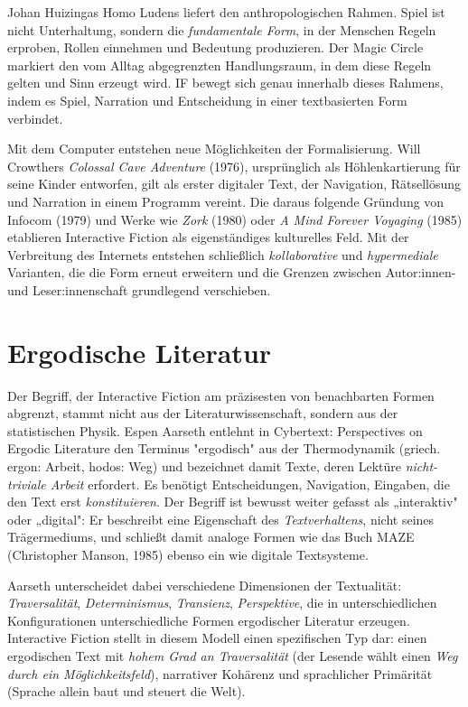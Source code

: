 \documentclass[parskip=half,a4paper,11pt]{scrreprt}
\begin{document}
Johan Huizingas Homo Ludens \citep{Huizinga1938} liefert den anthropologischen Rahmen. Spiel ist nicht Unterhaltung, sondern die \textit{fundamentale Form}, in der Menschen Regeln erproben, Rollen einnehmen und Bedeutung produzieren. Der Magic Circle markiert den vom Alltag abgegrenzten Handlungsraum, in dem diese Regeln gelten und Sinn erzeugt wird. IF bewegt sich genau innerhalb dieses Rahmens, indem es Spiel, Narration und Entscheidung in einer textbasierten Form verbindet.

Mit dem Computer entstehen neue Möglichkeiten der Formalisierung. Will Crowthers \textit{Colossal Cave Adventure} (1976), ursprünglich als Höhlenkartierung für seine Kinder entworfen, gilt als erster digitaler Text, der Navigation, Rätsellösung und Narration in einem Programm vereint. Die daraus folgende Gründung von Infocom (1979) und Werke wie \textit{Zork} (1980) oder \textit{A Mind Forever Voyaging} (1985) etablieren Interactive Fiction als eigenständiges kulturelles Feld. Mit der Verbreitung des Internets entstehen schließlich\textit{ kollaborative} und \textit{hypermediale }Varianten, die die Form erneut erweitern und die Grenzen zwischen Autor:innen- und Leser:innenschaft grundlegend verschieben.

\section{Ergodische Literatur}

Der Begriff, der Interactive Fiction am präzisesten von benachbarten Formen abgrenzt, stammt nicht aus der Literaturwissenschaft, sondern aus der statistischen Physik. Espen Aarseth entlehnt in Cybertext: Perspectives on Ergodic Literature \citep{Aarseth1997} den Terminus "ergodisch" aus der Thermodynamik (griech. ergon: Arbeit, hodos: Weg) und bezeichnet damit Texte, deren Lektüre \textit{nicht-triviale Arbeit} erfordert. Es benötigt Entscheidungen, Navigation, Eingaben, die den Text erst\textit{ konstituieren}. Der Begriff ist bewusst weiter gefasst als „interaktiv" oder „digital": Er beschreibt eine Eigenschaft des \textit{Textverhaltens}, nicht seines Trägermediums, und schließt damit analoge Formen wie das Buch MAZE (Christopher Manson, 1985) ebenso ein wie digitale Textsysteme.

Aarseth unterscheidet dabei verschiedene Dimensionen der Textualität: \textit{Traversalität}, \textit{Determinismus}, \textit{Transienz}, \textit{Perspektive}, die in unterschiedlichen Konfigurationen unterschiedliche Formen ergodischer Literatur erzeugen. Interactive Fiction stellt in diesem Modell einen spezifischen Typ dar: einen ergodischen Text mit \textit{hohem Grad an Traversalität} (der Lesende wählt einen \textit{Weg durch ein Möglichkeitsfeld}), narrativer Kohärenz und sprachlicher Primärität (Sprache allein baut und steuert die Welt).
\end{document}
